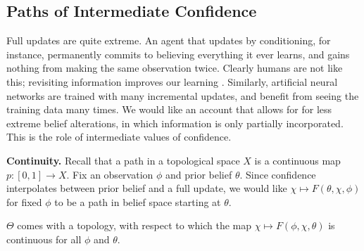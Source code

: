 \subsection{%
	Paths of Intermediate Confidence
	}

Full updates are quite extreme.
An agent that updates by conditioning, for instance,
permanently commits to believing everything it ever learns,
and gains nothing from making the same observation twice.
Clearly humans are not like this; revisiting information
 	improves our learning \parencite{ausubel1965effect}.
Similarly, artificial neural networks are trained with
 	many incremental updates, and benefit from seeing 
	the training data many times.
We would like an account that allows for for less extreme belief alterations,
in which information is only partially incorporated.
This is the role of intermediate values of confidence.

\textbf{Continuity.}
Recall that a path in a topological space $X$ is a continuous map $p : [0,1] \to X$. 
Fix an observation $\phi$ and prior belief $\theta$. 
Since confidence interpolates 
between prior belief and a full update,
we would like 
$\chi \mapsto F(\theta,\chi,\phi)$
for fixed $\phi$ to be a path
in belief space starting at $\theta$.

\begin{CFaxioms}[nosep]
	\item
	$\Theta$ comes with a topology, with respect to which
	the map
	$
	\chi \mapsto F(\phi,\chi,\theta)
	$
	is continuous
	for all $\phi$ and $\theta$.
	\label{ax:cont}
\end{CFaxioms}


